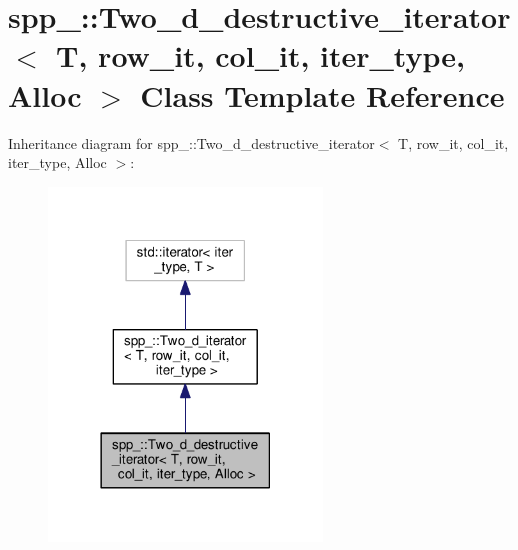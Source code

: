 \hypertarget{classspp___1_1_two__d__destructive__iterator}{}\section{spp\+\_\+\+:\+:Two\+\_\+d\+\_\+destructive\+\_\+iterator$<$ T, row\+\_\+it, col\+\_\+it, iter\+\_\+type, Alloc $>$ Class Template Reference}
\label{classspp___1_1_two__d__destructive__iterator}


Inheritance diagram for spp\+\_\+\+:\+:Two\+\_\+d\+\_\+destructive\+\_\+iterator$<$ T, row\+\_\+it, col\+\_\+it, iter\+\_\+type, Alloc $>$\+:\nopagebreak
\begin{figure}[H]
\begin{center}
\leavevmode
\includegraphics[width=206pt]{classspp___1_1_two__d__destructive__iterator__inherit__graph}
\end{center}
\end{figure}


